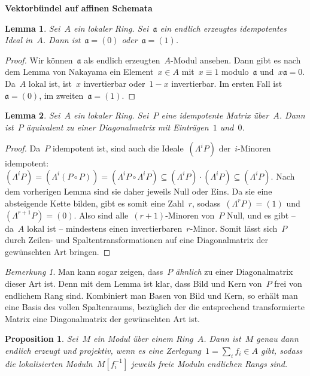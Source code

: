 \documentclass[12pt]{scrartcl}
\theoremstyle{definition}
\theoremstyle{plain}
\newtheorem*{prop}{Proposition}
\newtheorem*{lemma}{Lemma}
\theoremstyle{remark}
\newtheorem*{rem}{Bemerkung}
\newcommand{\aaa}{\mathfrak{a}}
\begin{document}
\enlargethispage{4em}

\begin{center}\huge\textbf{\textsf{Vektorbündel auf affinen Schemata}}\end{center}
\bigskip

\begin{lemma}Sei~$A$ ein lokaler Ring. Sei~$\aaa$ ein endlich erzeugtes
idempotentes Ideal in~$A$. Dann ist~$\aaa = (0)$ oder~$\aaa = (1)$.\end{lemma}

\begin{proof}Wir können~$\aaa$ als endlich erzeugten~$A$-Modul ansehen. Dann
gibt es nach dem Lemma von Nakayama ein Element~$x \in A$ mit~$x \equiv 1$
modulo~$\aaa$ und~$x \aaa = 0$. Da~$A$ lokal ist, ist~$x$ invertierbar
oder~$1-x$ invertierbar. Im ersten Fall ist~$\aaa = (0)$, im zweiten~$\aaa =
(1)$.\end{proof}

\begin{lemma}Sei~$A$ ein lokaler Ring. Sei~$P$ eine idempotente Matrix
über~$A$. Dann ist~$P$ äquivalent zu einer Diagonalmatrix mit Einträgen~$1$
und~$0$.\end{lemma}

\begin{proof}Da~$P$ idempotent ist, sind auch die Ideale~$(\Lambda^i P)$
der~$i$-Minoren idempotent: $(\Lambda^i P) = (\Lambda^i (P \circ P)) =
(\Lambda^i P \circ \Lambda^i P) \subseteq (\Lambda^i P) \cdot (\Lambda^i P)
\subseteq (\Lambda^i P)$. Nach dem vorherigen Lemma sind sie daher jeweils
Null oder Eins. Da sie eine absteigende Kette bilden, gibt es somit eine
Zahl~$r$, sodass~$(\Lambda^r P) = (1)$ und~$(\Lambda^{r+1} P) = (0)$. Also sind
alle~$(r+1)$-Minoren von~$P$ Null, und es gibt -- da~$A$ lokal ist --
mindestens einen invertierbaren~$r$-Minor. Somit lässt sich~$P$ durch Zeilen-
und Spaltentransformationen auf eine Diagonalmatrix der gewünschten Art
bringen. \end{proof}

\begin{rem}Man kann sogar zeigen, dass~$P$ \emph{ähnlich} zu einer
Diagonalmatrix dieser Art ist. Denn mit dem Lemma ist klar, dass Bild und Kern
von~$P$ frei von endlichem Rang sind. Kombiniert man Basen von Bild und Kern,
so erhält man eine Basis des vollen Spaltenraums, bezüglich der die
entsprechend transformierte Matrix eine Diagonalmatrix der gewünschten Art
ist.\end{rem}

\begin{prop}Sei~$M$ ein Modul über einem Ring~$A$. Dann ist~$M$ genau dann
endlich erzeugt und projektiv, wenn es eine Zerlegung~$1 = \sum_i f_i \in A$
gibt, sodass die lokalisierten Moduln~$M[f_i^{-1}]$ jeweils freie Moduln
endlichen Rangs sind.\end{prop}
\end{document}
